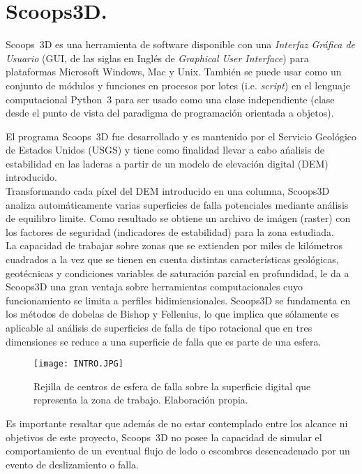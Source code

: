 \chapter{Scoops3D.}
\label{chap_Scoops3d}

Scoops~3D es una herramienta de software disponible con una \emph{Interfaz Gr\'afica de Usuario} (GUI, de las siglas en Ingl\'es de \textit{Graphical User Interface}) para plataformas Microsoft Windows, Mac y Unix. Tambi\'en se puede usar como un conjunto de m\'odulos y funciones en procesos por lotes (i.e. \textit{script}) en el lenguaje computacional Python~3 para ser usado como una clase independiente (clase desde el punto de vista del paradigma de programaci\'on orientada a objetos). 

El programa Scoops~3D fue desarrollado y es mantenido por el Servicio Geol\'ogico de Estados Unidos (USGS) y tiene como finalidad llevar a cabo a\'nalisis de estabilidad en las laderas a partir de un modelo de elevaci\'on digital (DEM) introducido.\\

Transformando cada p\'ixel del DEM introducido en una columna, Scoops3D analiza autom\'aticamente varias superficies de falla potenciales mediante an\'alisis de equilibro limite.  Como resultado se obtiene un archivo de im\'agen (raster) con los factores de seguridad (indicadores de estabilidad) para la zona estudiada.\\

La capacidad de trabajar sobre zonas que se extienden por miles de kil\'ometros cuadrados a la vez que se tienen en cuenta distintas caracter\'isticas geol\'ogicas, geot\'ecnicas y condiciones variables de saturaci\'on parcial en profundidad, le da a Scoops3D una gran ventaja sobre herramientas computacionales cuyo funcionamiento se limita a perfiles bidimiensionales.
Scoops3D se fundamenta en los m\'etodos de dobelas de Bishop y Fellenius, lo que implica que s\'olamente es aplicable al an\'alisis de superficies de falla de tipo rotacional que en tres dimensiones se reduce a una superficie de falla que es parte de una esfera.

\begin{figure}[H]
\centering
\texttt{[image: INTRO.JPG]}
\caption{Rejilla de centros de esfera de falla sobre la superficie digital que representa la zona de trabajo. Elaboraci\'on propia.}
\end{figure}

Es importante resaltar que adem\'as de no estar contemplado entre los alcance ni objetivos de este proyecto, Scoops~3D no posee la capacidad de simular el comportamiento de un eventual flujo de lodo o escombros desencadenado por un evento de deslizamiento o falla.
